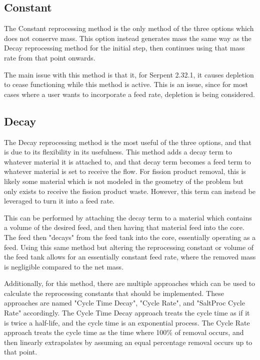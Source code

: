 \subsection{Constant}
The Constant reprocessing method is the only method of the three options which does not conserve mass. This option instead generates mass the same way as the Decay reprocessing method for the initial step, then continues using that mass rate from that point onwards.

The main issue with this method is that it, for Serpent 2.32.1, it causes depletion to cease functioning while this method is active. This is an issue, since for most cases where a user wants to incorporate a feed rate, depletion is being considered.

\subsection{Decay}
The Decay reprocessing method is the most useful of the three options, and that is due to its flexibility in its usefulness. This method adds a decay term to whatever material it is attached to, and that decay term becomes a feed term to whatever material is set to receive the flow. For fission product removal, this is likely some material which is not modeled in the geometry of the problem but only exists to receive the fission product waste. However, this term can instead be leveraged to turn it into a feed rate.

This can be performed by attaching the decay term to a material which contains a volume of the desired feed, and then having that material feed into the core. The feed then "decays" from the feed tank into the core, essentially operating as a feed. Using this same method but altering the reprocessing constant or volume of the feed tank allows for an essentially constant feed rate, where the removed mass is negligible compared to the net mass.

Additionally, for this method, there are multiple approaches which can be used to calculate the reprocessing constants that should be implemented. These approaches are named "Cycle Time Decay", "Cycle Rate", and "SaltProc Cycle Rate" accordingly. The Cycle Time Decay approach treats the cycle time as if it is twice a half-life, and the cycle time is an exponential process. The Cycle Rate approach treats the cycle time as the time where 100\% of removal occurs, and then linearly extrapolates by assuming an equal percentage removal occurs up to that point.

